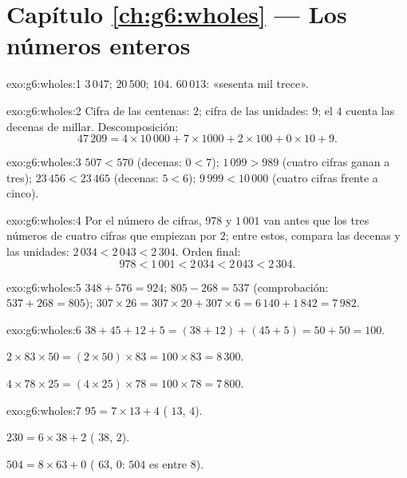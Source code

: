 \section*{Capítulo \ref{ch:g6:wholes} --- Los números enteros}

\begin{solution}{exo:g6:wholes:1}
$3\,047$; \quad $20\,500$; \quad $104$. \quad
$60\,013$: «sesenta mil trece».
\end{solution}

\begin{solution}{exo:g6:wholes:2}
Cifra de las centenas: $2$; cifra de las unidades: $9$; el $4$ cuenta las
decenas de millar. Descomposición:
\[
47\,209 = 4 \times 10\,000 + 7 \times 1000 + 2 \times 100 + 0 \times 10
+ 9 .
\]
\end{solution}

\begin{solution}{exo:g6:wholes:3}
$507 < 570$ (decenas: $0 < 7$); \quad
$1\,099 > 989$ (cuatro cifras ganan a tres); \quad
$23\,456 < 23\,465$ (decenas: $5 < 6$); \quad
$9\,999 < 10\,000$ (cuatro cifras frente a cinco).
\end{solution}

\begin{solution}{exo:g6:wholes:4}
Por el número de cifras, $978$ y $1\,001$ van antes que los tres
números de cuatro cifras que empiezan por $2$; entre estos, compara las decenas y las
unidades: $2\,034 < 2\,043 < 2\,304$. Orden final:
\[
978 < 1\,001 < 2\,034 < 2\,043 < 2\,304 .
\]
\end{solution}

\begin{solution}{exo:g6:wholes:5}
$348 + 576 = 924$; \quad $805 - 268 = 537$ (comprobación:
$537 + 268 = 805$); \quad $307 \times 26 = 307 \times 20 + 307 \times 6
= 6\,140 + 1\,842 = 7\,982$.
\end{solution}

\begin{solution}{exo:g6:wholes:6}
$38 + 45 + 12 + 5 = (38 + 12) + (45 + 5) = 50 + 50 = 100$.

$2 \times 83 \times 50 = (2 \times 50) \times 83 = 100 \times 83 =
8\,300$.

$4 \times 78 \times 25 = (4 \times 25) \times 78 = 100 \times 78 =
7\,800$.
\end{solution}

\begin{solution}{exo:g6:wholes:7}
$95 = 7 \times 13 + 4$ ( $13$,  $4$).

$230 = 6 \times 38 + 2$ ( $38$,  $2$).

$504 = 8 \times 63 + 0$ ( $63$,  $0$: $504$ es
 entre $8$).
\end{solution}

